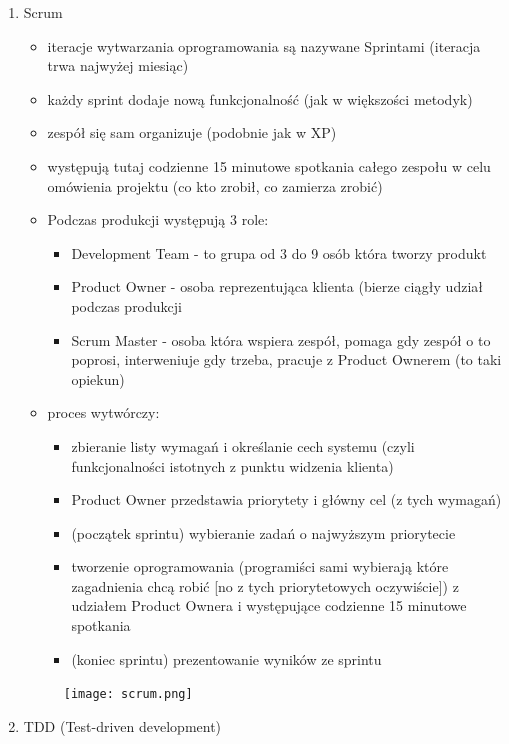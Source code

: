\documentclass[a4paper,12pt,oneside]{book}
\begin{document}
\begin{enumerate}
					\item Scrum
					\begin{itemize}
						\item iteracje wytwarzania oprogramowania są nazywane Sprintami (iteracja trwa
						najwyżej miesiąc)
						\item każdy sprint dodaje nową funkcjonalność (jak w większości metodyk)
						\item zespół się sam organizuje (podobnie jak w XP)
						\item występują tutaj codzienne 15 minutowe spotkania całego zespołu w celu
						omówienia projektu (co kto zrobił, co zamierza zrobić)
						\item Podczas produkcji występują 3 role:
						\begin{itemize}
							\item Development Team - to grupa od 3 do 9 osób która tworzy produkt
							\item Product Owner - osoba reprezentująca klienta (bierze ciągły udział
							podczas produkcji
							\item Scrum Master - osoba która wspiera zespół, pomaga gdy zespół o to
							poprosi, interweniuje gdy trzeba, pracuje z Product Ownerem (to taki
							opiekun)
						\end{itemize}
						\item proces wytwórczy:
						\begin{itemize}
							\item zbieranie listy wymagań i określanie cech systemu (czyli
							funkcjonalności istotnych z punktu widzenia klienta)
							\item Product Owner przedstawia priorytety i główny cel (z tych wymagań)
							\item (początek sprintu) wybieranie zadań o najwyższym priorytecie
							\item tworzenie oprogramowania (programiści sami wybierają które
							zagadnienia chcą robić [no z tych priorytetowych oczywiście]) z
							udziałem Product Ownera i występujące codzienne 15 minutowe
							spotkania
							\item (koniec sprintu) prezentowanie wyników ze sprintu
						\end{itemize}
					\end{itemize}
				\begin{figure}[h!]
					\centering\texttt{[image: scrum.png]}
				\end{figure}
				\item TDD (Test-driven development)

\end{enumerate}
\end{document}
